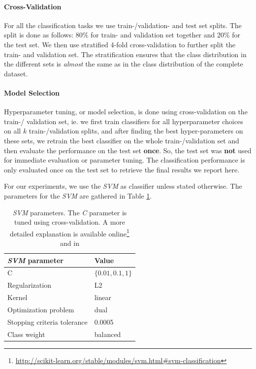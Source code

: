 

\paragraph{Cross-Validation}
For all the classification tasks we use train-/validation- and test set splits.
The split is done as follows: 80\% for train- and validation set together and 20\% for the test set.
We then use stratified 4-fold cross-validation to further split the train- and validation set.
The stratification ensures that the class distribution in the different sets is \textit{almost} the same as in the class distribution of the complete dataset.

\paragraph{Model Selection}
Hyperparameter tuning, or model selection, is done using cross-validation on the train-/ validation set, ie. we first train classifiers for all hyperparameter choices on all $k$ train-/validation splits, and after finding the best hyper-parameters on these sets, we retrain the best classifier on the whole train-/validation set and then evaluate the performance on the test set \textbf{once}.
So, the test set was \textbf{not} used for immediate evaluation or parameter tuning.
The classification performance is only evaluated once on the test set to retrieve the final results we report here.

For our experiments, we use the \textit{SVM}\cite{Cortes1995} as classifier unless stated otherwise.
The parameters for the \textit{SVM} are gathered in Table \ref{table:svm_parameters}.

\begin{table}[htb!]
	\centering
	\begin{tabular}{ll}
\toprule
		\textit{SVM} parameter & Value  \\
		\toprule
		C & $\{0.01, 0.1, 1\}$ \\
		Regularization & L2 \\
		Kernel & linear \\
		Optimization problem & dual \\
		Stopping criteria tolerance & 0.0005 \\
		Class weight & balanced \\
		\bottomrule
	\end{tabular}
	\caption[Table: SVM parameters]{\textit{SVM} parameters. The \textit{C} parameter is tuned using cross-validation. A more detailed explanation is available online\footnote{\url{http://scikit-learn.org/stable/modules/svm.html\#svm-classification}} and in \cite{Cortes1995}} %
	\label{table:svm_parameters}
\end{table}

